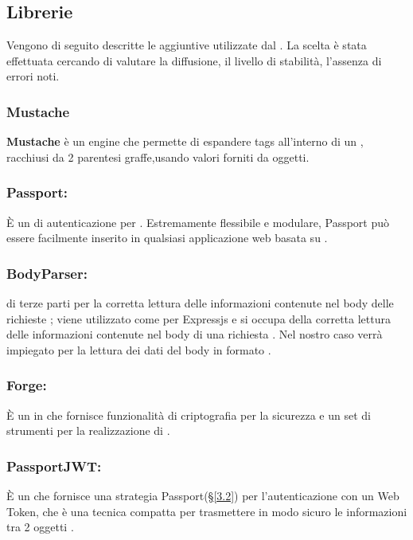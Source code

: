 \subsection{Librerie}
Vengono di seguito descritte le  aggiuntive utilizzate dal . La scelta è stata effettuata cercando di valutare la diffusione, il livello di stabilità, l'assenza di errori noti.

	\subsubsection{Mustache}
\textbf{Mustache} è un  engine che permette di espandere tags all'interno di un , racchiusi da 2 parentesi graffe,usando valori forniti da oggetti.

	\subsubsection{Passport:} \label{passport} È un  di autenticazione per . Estremamente flessibile e modulare, Passport può essere facilmente inserito in qualsiasi applicazione web basata su .

	\subsubsection{BodyParser:}  di terze parti per la corretta lettura delle informazioni contenute nel body delle richieste ; viene utilizzato come  per {Expressjs} e si occupa della corretta lettura delle informazioni contenute nel body di una richiesta
. Nel nostro caso verrà impiegato per la lettura dei dati del body in formato .

	\subsubsection{Forge:} È un  in  che fornisce funzionalità di criptografia per la sicurezza e un set di strumenti per la realizzazione di .

	\subsubsection{PassportJWT:} È un  che fornisce una strategia Passport(\S\ref{3.2}) per l'autenticazione con un  Web Token, che è una tecnica compatta per trasmettere in modo sicuro le informazioni tra 2 oggetti .

